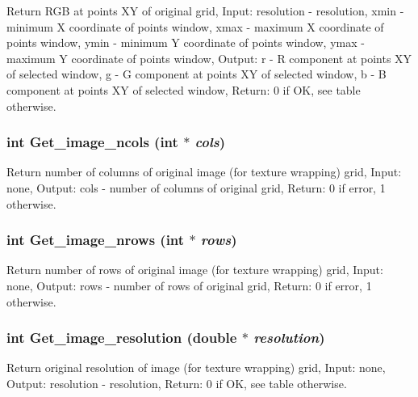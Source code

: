 Return RGB at points XY of original grid, Input: resolution - resolution, xmin - minimum X coordinate of points window, xmax - maximum X coordinate of points window, ymin - minimum Y coordinate of points window, ymax - maximum Y coordinate of points window, Output: r - R component at points XY of selected window, g - G component at points XY of selected window, b - B component at points XY of selected window, Return: 0 if OK, see table otherwise. 

\hypertarget{GisApi_8C_a57}{
\subsubsection[Get\_\-image\_\-ncols]{\setlength{\rightskip}{0pt plus 5cm}int Get\_\-image\_\-ncols (int $\ast$ {\em cols})}}
\label{GisApi_8C_a57}


Return number of columns of original image (for texture wrapping) grid, Input: none, Output: cols - number of columns of original grid, Return: 0 if error, 1 otherwise. 

\hypertarget{GisApi_8C_a56}{
\subsubsection[Get\_\-image\_\-nrows]{\setlength{\rightskip}{0pt plus 5cm}int Get\_\-image\_\-nrows (int $\ast$ {\em rows})}}
\label{GisApi_8C_a56}


Return number of rows of original image (for texture wrapping) grid, Input: none, Output: rows - number of rows of original grid, Return: 0 if error, 1 otherwise. 

\hypertarget{GisApi_8C_a55}{
\subsubsection[Get\_\-image\_\-resolution]{\setlength{\rightskip}{0pt plus 5cm}int Get\_\-image\_\-resolution (double $\ast$ {\em resolution})}}
\label{GisApi_8C_a55}


Return original resolution of image (for texture wrapping) grid, Input: none, Output: resolution - resolution, Return: 0 if OK, see table otherwise. 

